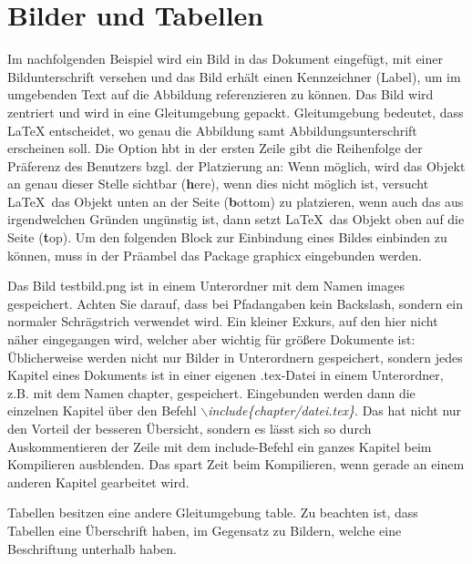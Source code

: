 \documentclass[ngerman]{book}	%
\begin{document}
\chapter{Bilder und Tabellen}

Im nachfolgenden Beispiel wird ein Bild in das Dokument eingefügt, mit einer Bildunterschrift versehen und das Bild erhält einen Kennzeichner (Label), um im umgebenden Text auf die Abbildung referenzieren zu können. Das Bild wird zentriert und wird in eine Gleitumgebung gepackt. Gleitumgebung bedeutet, dass \LaTeX\; entscheidet, wo genau die Abbildung samt Abbildungsunterschrift erscheinen soll. Die Option \glqq hbt\grqq\; in der ersten Zeile gibt die Reihenfolge der Präferenz des Benutzers bzgl. der Platzierung an: Wenn möglich, wird das Objekt an genau dieser Stelle sichtbar (\textbf{h}ere), wenn dies nicht möglich ist, versucht \LaTeX\, das Objekt unten an der Seite (\textbf{b}ottom) zu platzieren, wenn auch das aus irgendwelchen Gründen ungünstig ist, dann setzt \LaTeX\, das Objekt oben auf die Seite (\textbf{t}op). Um den folgenden Block zur Einbindung eines Bildes einbinden zu können, muss in der Präambel das Package graphicx eingebunden werden.


Das Bild testbild.png ist in einem Unterordner mit dem Namen images gespeichert. Achten Sie darauf, dass bei Pfadangaben kein Backslash, sondern ein normaler Schrägstrich verwendet wird. Ein kleiner Exkurs, auf den hier nicht näher eingegangen wird, welcher aber wichtig für größere Dokumente ist: Üblicherweise werden nicht nur Bilder in Unterordnern gespeichert, sondern jedes Kapitel eines Dokuments ist in einer eigenen .tex-Datei in einem Unterordner, z.B. mit dem Namen chapter, gespeichert. Eingebunden werden dann die einzelnen Kapitel über den Befehl \textit{$\backslash$include\{chapter/datei.tex\}}. Das hat nicht nur den Vorteil der besseren Übersicht, sondern es lässt sich so durch Auskommentieren der Zeile mit dem include-Befehl ein ganzes Kapitel beim Kompilieren \glqq ausblenden\grqq. Das spart Zeit beim Kompilieren, wenn gerade an einem anderen Kapitel gearbeitet wird.

Tabellen besitzen eine andere Gleitumgebung \glqq table\grqq . Zu beachten ist, dass Tabellen eine Überschrift haben, im Gegensatz zu Bildern, welche eine Beschriftung unterhalb haben. 
\end{document}
